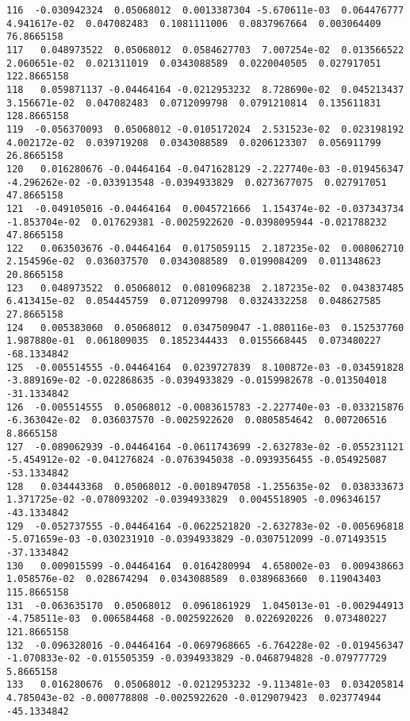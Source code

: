 \documentclass[15pt,a4paper,openright]{article}
\begin{document}
\begin{lstlisting}[language=AMPL, caption = data file]
116  -0.030942324  0.05068012  0.0013387304 -5.670611e-03  0.064476777  4.941617e-02  0.047082483  0.1081111006  0.0837967664  0.003064409   76.8665158
117   0.048973522  0.05068012  0.0584627703  7.007254e-02  0.013566522  2.060651e-02  0.021311019  0.0343088589  0.0220040505  0.027917051  122.8665158
118   0.059871137 -0.04464164 -0.0212953232  8.728690e-02  0.045213437  3.156671e-02  0.047082483  0.0712099798  0.0791210814  0.135611831  128.8665158
119  -0.056370093  0.05068012 -0.0105172024  2.531523e-02  0.023198192  4.002172e-02  0.039719208  0.0343088589  0.0206123307  0.056911799   26.8665158
120   0.016280676 -0.04464164 -0.0471628129 -2.227740e-03 -0.019456347 -4.296262e-02 -0.033913548 -0.0394933829  0.0273677075  0.027917051   47.8665158
121  -0.049105016 -0.04464164  0.0045721666  1.154374e-02 -0.037343734 -1.853704e-02  0.017629381 -0.0025922620 -0.0398095944 -0.021788232   47.8665158
122   0.063503676 -0.04464164  0.0175059115  2.187235e-02  0.008062710  2.154596e-02  0.036037570  0.0343088589  0.0199084209  0.011348623   20.8665158
123   0.048973522  0.05068012  0.0810968238  2.187235e-02  0.043837485  6.413415e-02  0.054445759  0.0712099798  0.0324332258  0.048627585   27.8665158
124   0.005383060  0.05068012  0.0347509047 -1.080116e-03  0.152537760  1.987880e-01  0.061809035  0.1852344433  0.0155668445  0.073480227  -68.1334842
125  -0.005514555 -0.04464164  0.0239727839  8.100872e-03 -0.034591828 -3.889169e-02 -0.022868635 -0.0394933829 -0.0159982678 -0.013504018  -31.1334842
126  -0.005514555  0.05068012 -0.0083615783 -2.227740e-03 -0.033215876 -6.363042e-02  0.036037570 -0.0025922620  0.0805854642  0.007206516    8.8665158
127  -0.089062939 -0.04464164 -0.0611743699 -2.632783e-02 -0.055231121 -5.454912e-02 -0.041276824 -0.0763945038 -0.0939356455 -0.054925087  -53.1334842
128   0.034443368  0.05068012 -0.0018947058 -1.255635e-02  0.038333673  1.371725e-02 -0.078093202 -0.0394933829  0.0045518905 -0.096346157  -43.1334842
129  -0.052737555 -0.04464164 -0.0622521820 -2.632783e-02 -0.005696818 -5.071659e-03 -0.030231910 -0.0394933829 -0.0307512099 -0.071493515  -37.1334842
130   0.009015599 -0.04464164  0.0164280994  4.658002e-03  0.009438663  1.058576e-02  0.028674294  0.0343088589  0.0389683660  0.119043403  115.8665158
131  -0.063635170  0.05068012  0.0961861929  1.045013e-01 -0.002944913 -4.758511e-03  0.006584468 -0.0025922620  0.0226920226  0.073480227  121.8665158
132  -0.096328016 -0.04464164 -0.0697968665 -6.764228e-02 -0.019456347 -1.070833e-02 -0.015505359 -0.0394933829 -0.0468794828 -0.079777729    5.8665158
133   0.016280676  0.05068012 -0.0212953232 -9.113481e-03  0.034205814  4.785043e-02 -0.000778808 -0.0025922620 -0.0129079423  0.023774944  -45.1334842

\end{lstlisting}
\end{document}

